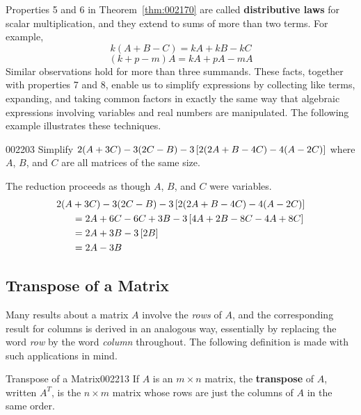Properties 5 and 6 in Theorem~\ref{thm:002170} are called \textbf{distributive laws} for scalar multiplication, and they extend to sums of more than two terms. For example,
\begin{equation*}
k(A + B - C) = kA + kB - kC
\end{equation*}
\begin{equation*}
(k + p - m)A = kA + pA -mA
\end{equation*}
Similar observations hold for more than three summands. These facts, together with properties 7 and 8, enable us to simplify expressions by collecting like terms, expanding, and taking common factors in exactly the same way that algebraic expressions involving variables and real numbers are manipulated. The following example illustrates these techniques.


\begin{example}{}{002203}
Simplify $2(A + 3C) - 3(2C - B) - 3 \left[ 2(2A + B - 4C) - 4(A - 2C) \right]$ where $A$, $B$, and $C$ are all matrices of the same size.


\begin{solution}
  The reduction proceeds as though $A$, $B$, and $C$ were variables.
\begin{align*}
2(A &+ 3C) - 3(2C - B) - 3 \left[ 2(2A + B - 4C) - 4(A - 2C) \right] \\
&= 2A + 6C - 6C + 3B - 3 \left[ 4A + 2B - 8C - 4A + 8C \right] \\
&= 2A + 3B - 3 \left[ 2B \right] \\
&= 2A - 3B
\end{align*}
\end{solution}
\end{example}

\subsection*{Transpose of a Matrix}

Many results about a matrix $A$ involve the \textit{rows} of $A$, and the corresponding result for columns is derived in an analogous way, essentially by replacing the word \textit{row} by the word \textit{column} throughout. The following definition is made with such applications in mind.


\begin{definition}{Transpose of a Matrix}{002213}
If $A$ is an $m \times n$ matrix, the \textbf{transpose} of $A$, written $A^{T}$, is the $n \times m$ matrix whose rows are just the columns of $A$ in the same order.
\end{definition}

